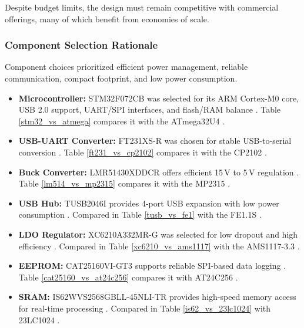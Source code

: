 \documentclass[12pt]{article}
\begin{document}
Despite budget limits, the design must remain competitive with commercial offerings, many of which benefit from economies of scale.

\subsubsection{Component Selection Rationale}

Component choices prioritized efficient power management, reliable communication, compact footprint, and low power consumption.

\begin{itemize}
    \item \textbf{Microcontroller:} STM32F072CB was selected for its ARM Cortex-M0 core, USB 2.0 support, UART/SPI interfaces, and flash/RAM balance . Table \ref{stm32_vs_atmega} compares it with the ATmega32U4 \cite{microchip2023atmega}.

    \item \textbf{USB-UART Converter:} FT231XS-R was chosen for stable USB-to-serial conversion \cite{ftdi2023ft231x}. Table \ref{ft231_vs_cp2102} compares it with the CP2102 \cite{silabs2023cp2102}.

    \item \textbf{Buck Converter:} LMR51430XDDCR offers efficient 15\,V to 5\,V regulation \cite{ti2023stepdown}. Table \ref{lm514_vs_mp2315} compares it with the MP2315 \cite{mps2023mp2315}.

    \item \textbf{USB Hub:} TUSB2046I provides 4-port USB expansion with low power consumption \cite{ti2023tusb}. Compared in Table \ref{tusb_vs_fe1} with the FE1.1S \cite{terminus2023fe11s}.

    \item \textbf{LDO Regulator:} XC6210A332MR-G was selected for low dropout and high efficiency \cite{torex2023ldo}. Compared in Table \ref{xc6210_vs_ams1117} with the AMS1117-3.3 \cite{ams2023ams1117}.

    \item \textbf{EEPROM:} CAT25160VI-GT3 supports reliable SPI-based data logging \cite{onsemi2023cat}. Table \ref{cat25160_vs_at24c256} compares it with AT24C256 \cite{microchip2023at24c256}.

    \item \textbf{SRAM:} IS62WVS2568GBLL-45NLI-TR provides high-speed memory access for real-time processing \cite{issi2023sram}. Compared in Table \ref{is62_vs_23lc1024} with 23LC1024 \cite{microchip2023sram}.
\end{itemize}
\end{document}
